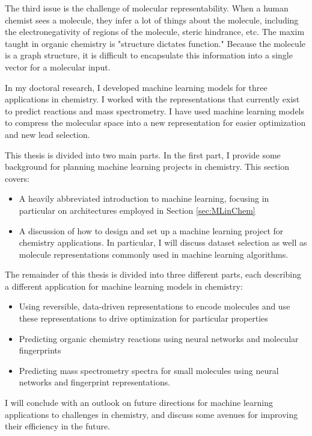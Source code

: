 The third issue is the challenge of molecular representability. When a human chemist sees a molecule, they infer a lot of things about the molecule, including the electronegativity of regions of the molecule, steric hindrance, etc. The maxim taught in organic chemistry is "structure dictates function."
Because the molecule is a graph structure, it is difficult to encapsulate this information into a single vector for a molecular input.

In my doctoral research, I developed machine learning models for three applications in chemistry. I worked with the representations that currently exist to predict reactions and mass spectrometry. I have used machine learning models to compress the molecular space into a new representation for easier optimization and new lead selection.

This thesis is divided into two main parts. In the first part, I provide some background for planning machine learning projects in chemistry. This section covers:
\begin{itemize}
\item A heavily abbreviated introduction to machine learning, focusing in particular on architectures employed in Section \ref{sec:MLinChem}
\item A discussion of how to design and set up a machine learning project for chemistry applications. In particular, I will discuss dataset selection as well as molecule representations commonly used in machine learning algorithms.
\end{itemize}

The remainder of this thesis is divided into three different parts, each describing a different application for machine learning models in chemistry:
\begin{itemize}
\item Using reversible, data-driven representations to encode molecules and use these representations to drive optimization for particular properties
\item Predicting organic chemistry reactions using neural networks and molecular fingerprints
\item Predicting mass spectrometry spectra for small molecules using neural networks and fingerprint representations.
\end{itemize}

I will conclude with an outlook on future directions for machine learning applications to challenges in chemistry, and discuss some avenues for improving their efficiency in the future.
